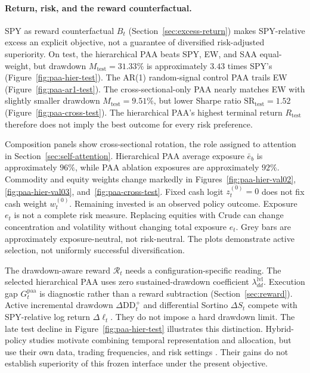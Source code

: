 \paragraph{Return, risk, and the reward counterfactual.}
SPY as reward counterfactual \(B_t\) (Section~\ref{sec:excess-return}) makes SPY-relative excess an explicit objective, not a guarantee of diversified risk-adjusted superiority. On test, the hierarchical PAA beats SPY, EW, and SAA equal-weight, but drawdown \(M_{\mathrm{test}}=31.33\%\) is approximately \(3.43\) times SPY's (Figure~\ref{fig:paa-hier-test}). The AR(1) random-signal control PAA trails EW (Figure~\ref{fig:paa-ar1-test}). The cross-sectional-only PAA nearly matches EW with slightly smaller drawdown \(M_{\mathrm{test}}=9.51\%\), but lower Sharpe ratio \(\mathrm{SR}_{\mathrm{test}}=1.52\) (Figure~\ref{fig:paa-cross-test}). The hierarchical PAA's highest terminal return \(R_{\mathrm{test}}\) therefore does not imply the best outcome for every risk preference.

Composition panels show cross-sectional rotation, the role assigned to attention in Section~\ref{sec:self-attention}. Hierarchical PAA average exposure \(\bar e_b\) is approximately \(96\%\), while PAA ablation exposures are approximately \(92\%\). Commodity and equity weights change markedly in Figures~\ref{fig:paa-hier-val02}, \ref{fig:paa-hier-val03}, and~\ref{fig:paa-cross-test}. Fixed cash logit \(z_t^{(0)}=0\) does not fix cash weight \(w_t^{(0)}\). Remaining invested is an observed policy outcome. Exposure \(e_t\) is not a complete risk measure. Replacing equities with Crude can change concentration and volatility without changing total exposure \(e_t\). Grey bars are approximately exposure-neutral, not risk-neutral. The plots demonstrate active selection, not uniformly successful diversification.

The drawdown-aware reward \(\mathcal R_t\) needs a configuration-specific reading. The selected hierarchical PAA uses zero sustained-drawdown coefficient \(\lambda_{dd}^{\mathrm{lvl}}\). Execution gap \(G_t^{\mathrm{paa}}\) is diagnostic rather than a reward subtraction (Section~\ref{sec:reward}). Active incremental drawdown \(\Delta\mathrm{DD}_t^+\) and differential Sortino \(\Delta S_t\) compete with SPY-relative log return \(\Delta\ell_t\). They do not impose a hard drawdown limit. The late test decline in Figure~\ref{fig:paa-hier-test} illustrates this distinction. Hybrid-policy studies motivate combining temporal representation and allocation, but use their own data, trading frequencies, and risk settings \cite{JunKevin.2025,GabrielNixonRaj.2025}. Their gains do not establish superiority of this frozen interface under the present objective.

